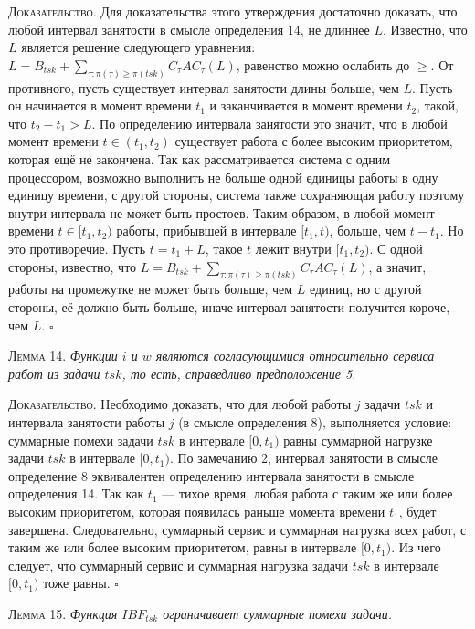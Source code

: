 \textsc{Доказательство.}  Для доказательства этого утверждения достаточно доказать,
  что любой интервал занятости в смысле определения 14, не длиннее $L$.
  Известно, что $L$ является решение следующего уравнения:
    $L = B_{tsk} + \sum_{\tau: \pi(\tau) \geq \pi(tsk)} C_{\tau}AC_{\tau}(L)$,
    равенство можно ослабить до $\geq$.
  От противного, пусть существует интервал занятости длины больше, чем $L$. Пусть он
    начинается в момент времени $t_1$ и заканчивается в момент времени $t_2$, такой, что $t_2 - t_1 > L$.
  По определению интервала занятости это значит, что в любой момент времени $t \in (t_1, t_2)$
    существует работа с более высоким приоритетом, которая ещё не закончена.
  Так как рассматривается система с одним процессором, возможно выполнить не больше одной
    единицы работы в одну единицу времени, с другой стороны, система также сохраняющая работу
    поэтому внутри интервала не может быть простоев.
  Таким образом, в любой момент времени $t \in [t_1, t_2)$ работы, прибывшей в интервале
    $[t_1, t)$, больше, чем $t - t_1$.
  Но это противоречие. Пусть $t = t_1 + L$, такое $t$ лежит внутри $[t_1, t_2)$.
    С одной стороны, известно, что $L = B_{tsk} + \sum_{\tau: \pi(\tau) \geq \pi(tsk)} C_{\tau}AC_{\tau}(L)$,
      а значит, работы на промежутке не может быть больше, чем $L$ единиц,
    но с другой стороны, её должно быть больше, иначе интервал занятости получится короче, чем $L$.
$\square$


\textsc{Лемма 14.}
\textit{Функции $i$ и $w$ являются согласующимися относительно сервиса
  работ из задачи $tsk$, то есть, справедливо предположение 5. }

\textsc{Доказательство.}  Необходимо доказать, что для любой работы $j$ задачи $tsk$
  и интервала занятости работы $j$ (в смысле определения 8), выполняется условие:
    суммарные помехи задачи $tsk$ в интервале $[0, t_1)$
    равны суммарной нагрузке задачи $tsk$ в интервале $[0, t_1)$.
  По замечанию 2, интервал занятости в смысле определение 8 эквивалентен
    определению интервала занятости в смысле определения 14.
  Так как $t_1$ --- тихое время, любая работа с таким же или более высоким приоритетом,
    которая появилась раньше момента времени $t_1$, будет завершена.
  Следовательно, суммарный сервис и суммарная нагрузка всех работ, с таким же или
    более высоким приоритетом, равны в интервале $[0, t_1)$.
  Из чего следует, что суммарный сервис и суммарная нагрузка задачи $tsk$
    в интервале $[0, t_1)$ тоже равны. $\square$


\textsc{Лемма 15.}
\textit{Функция $IBF_{tsk}$ ограничивает суммарные помехи задачи. }

